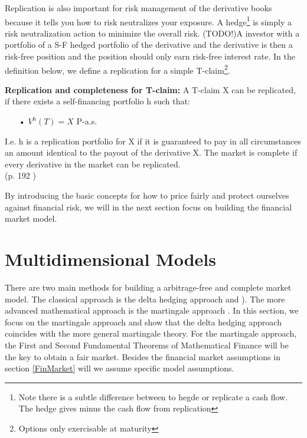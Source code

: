 Replication is also important for risk management of the derivative books because it tells you how to risk neutralizes your exposure. A hedge\footnote{Note there is a subtle difference between to hegde or replicate a cash flow. The hedge gives minus the cash flow from replication} is simply a risk neutralization action to minimize the overall risk. (TODO!)A investor with a portfolio of a S-F hedged portfolio of the derivative and the derivative is then a risk-free position and the position should only earn risk-free interest rate. In the definition below, we define a replication for a simple T-claim\footnote{Options only exercisable at maturity}.
\theoremstyle{definition}
\begin{definition}{\textbf{Replication and completeness for T-claim: }}
A T-claim X can be replicated, if there exists a self-financing portfolio h such that:
\begin{enumerate}
\item[•] $V^{h}(T)=X$ P-a.s.
\end{enumerate}
I.e. h is a replication portfolio for X if it is guaranteed to pay in all circumstances an amount identical to the payout of the derivative X.
The market is complete if every derivative in the market can be replicated.\\
\null \hfill (p. 192 \parencite{finKont})
\end{definition}

By introducing the basic concepts for how to price fairly and protect ourselves against financial risk, we will in the next section focus on building the financial market model.


\section{Multidimensional Models}\label{MultiDimModel}
There are two main methods for building a arbitrage-free and complete market model. The classical approach is the delta hedging approach \parencite{B-S-Paper} and \parencite{CRR}). The more advanced mathematical approach is the martingale approach  \parencite{finKont}. In this section, we focus on the martingale approach and show that the delta hedging approach coincides with the more general martingale theory. For the martingale approach, the First and Second Fundamental Theorems of Mathematical Finance will be the key to obtain a fair market. Besides the financial market assumptions in section \ref{FinMarket} will we assume specific model assumptions.

